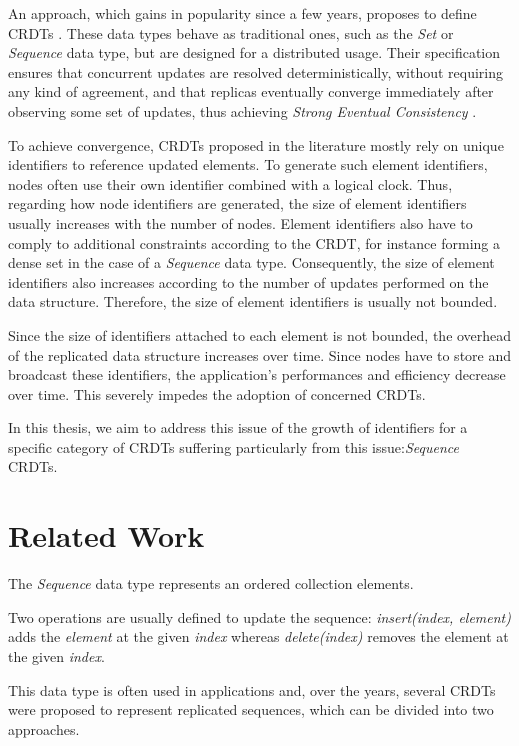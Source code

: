 \documentclass[sigplan]{acmart}
\begin{document}
An approach, which gains in popularity since a few years, proposes to define \acfp{CRDT} \cite{shapiro_2011_crdt}.
These data types behave as traditional ones, such as the \emph{Set} or \emph{Sequence} data type, but are designed for a distributed usage.
Their specification ensures that concurrent updates are resolved deterministically, without requiring any kind of agreement, and that replicas eventually converge immediately after observing some set of updates,
thus achieving \emph{Strong Eventual Consistency} \cite{shapiro_2011_crdt}.

To achieve convergence, \acp{CRDT} proposed in the literature mostly rely on unique identifiers to reference updated elements.
To generate such element identifiers, nodes often use their own identifier combined with a logical clock.
Thus, regarding how node identifiers are generated, the size of element identifiers usually increases with the number of nodes.
Element identifiers also have to comply to additional constraints according to the \ac{CRDT}, for instance forming a dense set in the case of a \emph{Sequence} data type.
Consequently, the size of element identifiers also increases according to the number of updates performed on the data structure.
Therefore, the size of element identifiers is usually not bounded.

Since the size of identifiers attached to each element is not bounded, the overhead of the replicated data structure increases over time.
Since nodes have to store and broadcast these identifiers, the application's performances and efficiency decrease over time.
This severely impedes the adoption of concerned \acp{CRDT}.

In this thesis, we aim to address this issue of the growth of identifiers for a specific category of \acp{CRDT} suffering particularly from this issue:\emph{Sequence} \acp{CRDT}.

\section{Related Work}

The \emph{Sequence} data type represents an ordered collection elements.

Two operations are usually defined to update the sequence:
\emph{insert(index, element)} adds the \emph{element} at the given \emph{index}
whereas \emph{delete(index)} removes the element at the given \emph{index}.

This data type is often used in applications and, over the years, several \acp{CRDT} \cite{shapiro:inria-00555588} were proposed to represent replicated sequences, which can be divided into two approaches.
\end{document}
